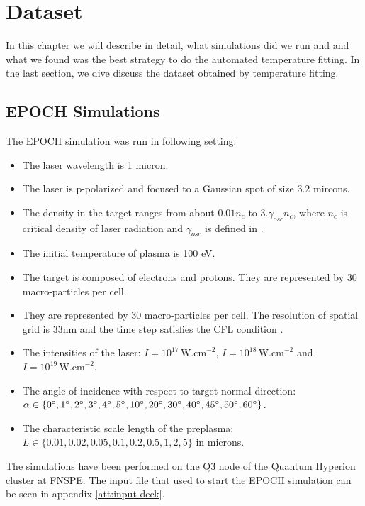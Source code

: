 \chapter{Dataset}
In this chapter we will describe in detail, what simulations did we run and and what we found was the best strategy to do the automated temperature fitting. In the last section, we dive discuss the dataset obtained by temperature fitting.
\section{EPOCH Simulations}
The EPOCH simulation was run in following setting:
\begin{itemize}
	\item The laser wavelength is 1 micron.
	\item The laser is p-polarized and focused to a Gaussian spot of size $3.2$ mircons.
	\item The density in the target ranges from about $0.01n_c$ to $3.\gamma_{osc}n_c$, where $n_c$ is critical density of laser radiation \cite{cui2013} and $\gamma_{osc}$ is defined in \cite{cui2013}.
	\item The initial temperature of plasma is 100 eV.
	\item The target is composed of electrons and protons. They are represented by 30 macro-particles per cell.
	\item They are represented by 30 macro-particles per cell. The resolution of spatial grid is 33nm and the time step satisfies the CFL condition \cite{arber2015}.
	\item The intensities of the laser: $I=10^{17}\,\mathrm{W.cm}^{-2}$, $I=10^{18} \,\mathrm{W.cm}^{-2}$ and \newline$I=10^{19}\,\mathrm{W.cm}^{-2}$.
	\item The angle of incidence with respect to target normal direction: \newline $\alpha \in \{0\degree,1\degree,2\degree,3\degree,4\degree,5\degree,10\degree,20\degree,30\degree,40\degree,45\degree,50\degree,60\degree\}$.
	\item The characteristic scale length of the preplasma: \newline $L\in\{0.01,0.02,0.05,0.1,0.2,0.5,1,2,5\}$ in microns.
	
\end{itemize}
The simulations have been performed on the Q3 node of the Quantum Hyperion cluster at FNSPE. The input file that used to start the EPOCH simulation can be seen in appendix \ref{att:input-deck}.

